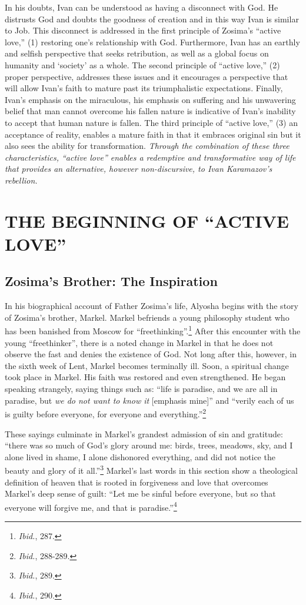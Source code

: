 In his doubts, Ivan can be understood as having a disconnect with God. He distrusts God and doubts the goodness of creation and in this way Ivan is similar to Job. This disconnect is addressed in the first principle of Zosima's ``active love,'' (1) restoring one's relationship with God. Furthermore, Ivan has an earthly and selfish perspective that seeks retribution, as well as a global focus on humanity and `society' as a whole. The second principle of ``active love,'' (2) proper perspective, addresses these issues and it encourages a perspective that will allow Ivan's faith to mature past its triumphalistic expectations. Finally, Ivan's emphasis on the miraculous, his emphasis on suffering and his unwavering belief that man cannot overcome his fallen nature is indicative of Ivan's inability to accept that human nature is fallen. The third principle of ``active love,'' (3) an acceptance of reality, enables a mature faith in that it embraces original sin but it also sees the ability for transformation. \emph{Through the combination of these three characteristics, ``active love'' enables a redemptive and transformative way of life that provides an alternative, however non-discursive,  to Ivan Karamazov's rebellion.}

\chapter{THE BEGINNING OF ``ACTIVE LOVE''}
\section{Zosima's Brother: The Inspiration}
In his biographical account of Father Zosima's life, Alyosha begins with the story of Zosima's brother, Markel. Markel befriends a young philosophy student who has been banished from Moscow for ``freethinking''.\footnote{\emph{Ibid.}, 287.} After this encounter with the young ``freethinker'', there is a noted change in Markel in that he does not observe the fast and denies the existence of God. Not long after this, however, in the sixth week of Lent, Markel becomes terminally ill. Soon, a spiritual change took place in Markel. His faith was restored and even strengthened. He began speaking strangely, saying things such as: ``life is paradise, and we are all in paradise, but \emph{we do not want to know it} [emphasis mine]'' and ``verily each of us is guilty before everyone, for everyone and everything.''\footnote{\emph{Ibid.}, 288-289.} 

These sayings culminate in Markel's grandest admission of sin and gratitude: ``there was so much of God's glory around me: birds, trees, meadows, sky, and I alone lived in shame, I alone dishonored everything, and did not notice the beauty and glory of it all.''\footnote{\emph{Ibid.}, 289.} Markel's last words in this section show a theological definition of heaven that is rooted in forgiveness and love that overcomes Markel's deep sense of guilt: ``Let me be sinful before everyone, but so that everyone will forgive me, and that is paradise.''\footnote{\emph{Ibid.}, 290.}

